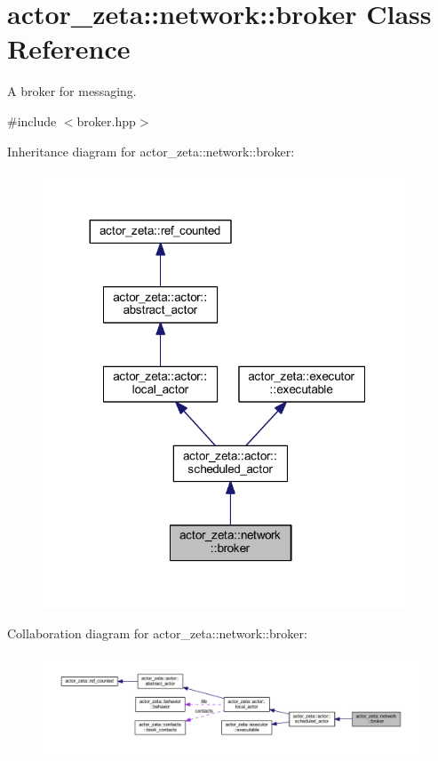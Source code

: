\hypertarget{classactor__zeta_1_1network_1_1broker}{}\section{actor\+\_\+zeta\+:\+:network\+:\+:broker Class Reference}
\label{classactor__zeta_1_1network_1_1broker}


A broker for messaging.  




{\ttfamily \#include $<$broker.\+hpp$>$}



Inheritance diagram for actor\+\_\+zeta\+:\+:network\+:\+:broker\+:\nopagebreak
\begin{figure}[H]
\begin{center}
\leavevmode
\includegraphics[width=311pt]{classactor__zeta_1_1network_1_1broker__inherit__graph}
\end{center}
\end{figure}


Collaboration diagram for actor\+\_\+zeta\+:\+:network\+:\+:broker\+:\nopagebreak
\begin{figure}[H]
\begin{center}
\leavevmode
\includegraphics[width=350pt]{classactor__zeta_1_1network_1_1broker__coll__graph}
\end{center}
\end{figure}
